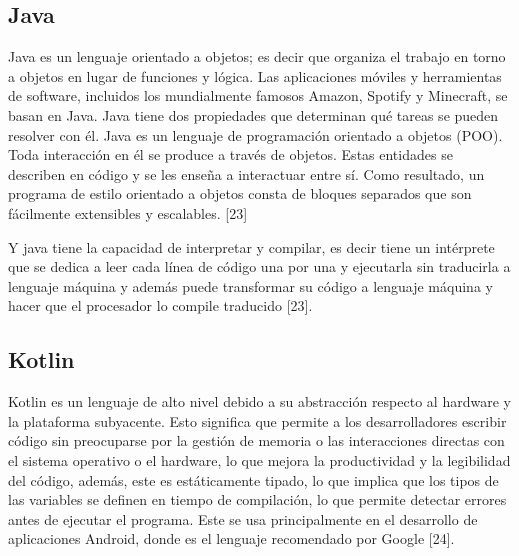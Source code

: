 \subsection{Java}

\begin{list}{}%
    {\setlength{\leftmargin}{1cm}\setlength{\rightmargin}{1cm}}
    \item\relax
    \small

Java es un lenguaje orientado a objetos; es decir que organiza el trabajo en torno a objetos en lugar de funciones y lógica. Las aplicaciones móviles y herramientas de software, incluidos los mundialmente famosos Amazon, Spotify y Minecraft, se basan en Java.
Java tiene dos propiedades que determinan qué tareas se pueden resolver con él.
Java es un lenguaje de programación orientado a objetos (POO). Toda interacción en él se produce a través de objetos. Estas entidades se describen en código y se les enseña a interactuar entre sí. Como resultado, un programa de estilo orientado a objetos consta de bloques separados que son fácilmente extensibles y escalables. [23]

\end{list}

Y java tiene la capacidad de interpretar y compilar, es decir tiene un intérprete que se dedica a leer cada línea de código una por una y ejecutarla sin traducirla a lenguaje máquina y además puede transformar su código  a lenguaje máquina y hacer que el procesador lo compile traducido [23]. 


\subsection{Kotlin}

Kotlin es un lenguaje de alto nivel debido a su abstracción respecto al hardware y la plataforma subyacente. Esto significa que permite a los desarrolladores escribir código sin preocuparse por la gestión de memoria o las interacciones directas con el sistema operativo o el hardware, lo que mejora la productividad y la legibilidad del código, además, este es estáticamente tipado, lo que implica que los tipos de las variables se definen en tiempo de compilación, lo que permite detectar errores antes de ejecutar el programa. Este se usa principalmente en el desarrollo de aplicaciones Android, donde es el lenguaje recomendado por Google [24].

